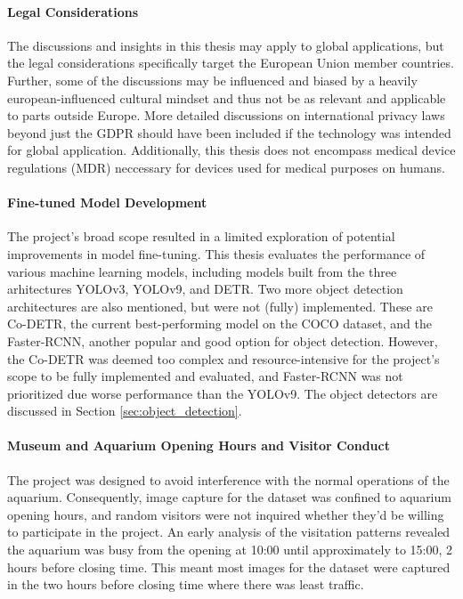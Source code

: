 \paragraph{Legal Considerations}
The discussions and insights in this thesis may apply to global applications, but the legal considerations specifically target the European Union member countries. Further, some of the discussions may be influenced and biased by a heavily european-influenced cultural mindset and thus not be as relevant and applicable to parts outside Europe. More detailed discussions on international privacy laws beyond just the GDPR should have been included if the technology was intended for global application. Additionally, this thesis does not encompass medical device regulations (MDR) neccessary for devices used for medical purposes on humans.

\paragraph{Fine-tuned Model Development}
The project's broad scope resulted in a limited exploration of potential improvements in model fine-tuning. This thesis evaluates the performance of various machine learning models, including models built from the three arhitectures YOLOv3, YOLOv9, and DETR. Two more object detection architectures are also mentioned, but were not (fully) implemented. These are Co-DETR, the current best-performing model on the COCO dataset, and the Faster-RCNN, another popular and good option for object detection. However, the Co-DETR was deemed too complex and resource-intensive for the project's scope to be fully implemented and evaluated, and Faster-RCNN was not prioritized due worse performance than the YOLOv9. The object detectors are discussed in Section \ref{sec:object_detection}.

\paragraph{Museum and Aquarium Opening Hours and Visitor Conduct}
\label{sec:scope_opening_hours}
The project was designed to avoid interference with the normal operations of the aquarium. Consequently, image capture for the dataset was confined to aquarium opening hours, and random visitors were not inquired whether they'd be willing to participate in the project. An early analysis of the visitation patterns revealed the aquarium was busy from the opening at 10:00 until approximately to 15:00, 2 hours before closing time. This meant most images for the dataset were captured in the two hours before closing time where there was least traffic.

